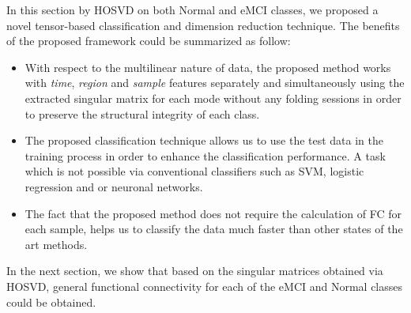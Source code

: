 \documentclass[preprint,12pt]{elsarticle}
\begin{document}
	
	In this section by HOSVD on both Normal and eMCI classes, we proposed a novel tensor-based classification and dimension reduction technique. The benefits of the proposed framework could be summarized as follow:
	\begin{itemize}
		\item With respect to the multilinear nature of data, the proposed method works with \textit{time}, \textit{region} and \textit{sample} features separately and simultaneously using the extracted singular matrix for each mode without any folding sessions in order to preserve the structural integrity of each class. 
		\item  The proposed classification technique allows us to use the test data in the training process in order to enhance the classification performance. A task which is not possible via conventional classifiers such as SVM, logistic regression and or neuronal networks. 
		\item 
		The fact that the proposed method does not require the calculation of FC for each sample, helps us to classify the data much faster than other states of the art methods.
	\end{itemize}
	In the next section, we show that based
	on the singular matrices obtained via HOSVD, general functional connectivity for each of the eMCI and Normal classes could be obtained.
\end{document}
